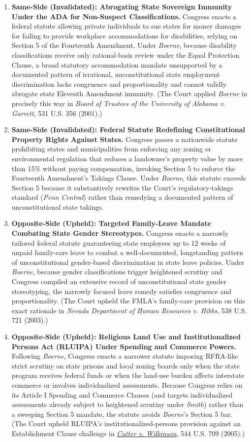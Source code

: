 \documentclass[12pt]{article}
\begin{document}
\begin{enumerate}
  \item \textbf{Same-Side (Invalidated): Abrogating State Sovereign Immunity Under the ADA for Non-Suspect Classifications.} Congress enacts a federal statute allowing private individuals to sue states for money damages for failing to provide workplace accommodations for disabilities, relying on Section 5 of the Fourteenth Amendment. Under \textit{Boerne}, because disability classifications receive only rational-basis review under the Equal Protection Clause, a broad statutory accommodation mandate unsupported by a documented pattern of irrational, unconstitutional state employment discrimination lacks congruence and proportionality and cannot validly abrogate state Eleventh Amendment immunity. (The Court applied \textit{Boerne} in precisely this way in \textit{Board of Trustees of the University of Alabama v. Garrett}, 531 U.S. 356 (2001).)
  \item \textbf{Same-Side (Invalidated): Federal Statute Redefining Constitutional Property Rights Against States.} Congress passes a nationwide statute prohibiting states and municipalities from enforcing any zoning or environmental regulation that reduces a landowner's property value by more than 15\% without paying compensation, invoking Section 5 to enforce the Fourteenth Amendment's Takings Clause. Under \textit{Boerne}, this statute exceeds Section 5 because it substantively rewrites the Court's regulatory-takings standard (\textit{Penn Central}) rather than remedying a documented pattern of unconstitutional state takings.
  \item \textbf{Opposite-Side (Upheld): Targeted Family-Leave Mandate Combating State Gender Stereotypes.} Congress enacts a narrowly tailored federal statute guaranteeing state employees up to 12 weeks of unpaid family-care leave to combat a well-documented, longstanding pattern of unconstitutional gender-based discrimination in state leave policies. Under \textit{Boerne}, because gender classifications trigger heightened scrutiny and Congress compiled an extensive record of unconstitutional state gender stereotyping, the narrowly focused leave remedy satisfies congruence and proportionality. (The Court upheld the FMLA's family-care provision on this exact rationale in \textit{Nevada Department of Human Resources v. Hibbs}, 538 U.S. 721 (2003).)
  \item \textbf{Opposite-Side (Upheld): Religious Land Use and Institutionalized Persons Act (RLUIPA) Under Spending and Commerce Powers.} Following \textit{Boerne}, Congress enacts a narrower statute imposing RFRA-like strict scrutiny on state prisons and local zoning boards only when the state program receives federal funds or when the land-use burden affects interstate commerce or involves individualized assessments. Because Congress relies on its Article I Spending and Commerce Clauses (and targets individualized assessments already subject to heightened scrutiny under \textit{Smith}) rather than a sweeping Section 5 mandate, the statute avoids \textit{Boerne}'s Section 5 bar. (The Court upheld RLUIPA's institutionalized-persons provision against an Establishment Clause challenge in \href{https://supreme.justia.com/cases/federal/us/544/709/}{\textit{Cutter v. Wilkinson}}, 544 U.S. 709 (2005).)

\end{enumerate}
\end{document}
